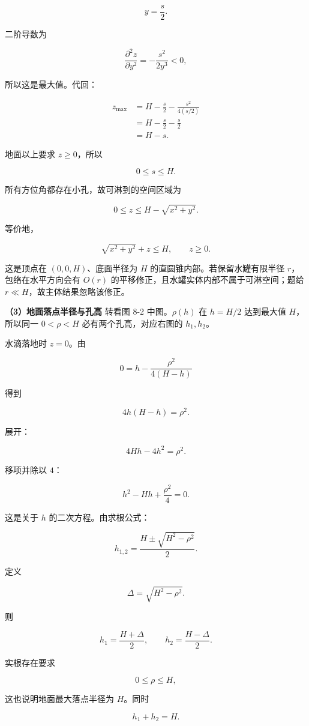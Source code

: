 \documentclass[12pt,a4paper,UTF8]{ctexart}
\begin{document}
\[y=\frac s2.\]

二阶导数为

\[\frac{\partial^2z}{\partial y^2}
=-\frac{s^2}{2y^3}<0,\]

所以这是最大值。代回：

\[\begin{aligned}
z_{\max}
&=H-\frac s2-\frac{s^2}{4(s/2)}\\
&=H-\frac s2-\frac s2\\
&=H-s.
\end{aligned}\]

地面以上要求 \(z\geq0\)，所以

\[0\leq s\leq H.\]

所有方位角都存在小孔，故可淋到的空间区域为

\[\boxed{
0\leq z\leq H-\sqrt{x^2+y^2}
}.\]

等价地，

\[\boxed{
\sqrt{x^2+y^2}+z\leq H,\qquad z\geq0
}.\]

这是顶点在 \((0,0,H)\)、底面半径为 \(H\)
的直圆锥内部。若保留水罐有限半径 \(r\)，包络在水平方向会有 \(O(r)\)
的平移修正，且水罐实体内部不属于可淋空间；题给
\(r\ll H\)，故主体结果忽略该修正。

\textbf{（3）地面落点半径与孔高} 转看图 8-2 中图。\(\rho(h)\) 在
\(h=H/2\) 达到最大值 \(H\)，所以同一 \(0<\rho<H\)
必有两个孔高，对应右图的 \(h_1,h_2\)。

水滴落地时 \(z=0\)。由

\[0=h-\frac{\rho^2}{4(H-h)}\]

得到

\[4h(H-h)=\rho^2.\]

展开：

\[4Hh-4h^2=\rho^2.\]

移项并除以 \(4\)：

\[h^2-Hh+\frac{\rho^2}{4}=0.\]

这是关于 \(h\) 的二次方程。由求根公式：

\[h_{1,2}
=\frac{H\pm\sqrt{H^2-\rho^2}}{2}.\]

定义

\[\Delta=\sqrt{H^2-\rho^2}.\]

则

\[h_1=\frac{H+\Delta}{2},\qquad
h_2=\frac{H-\Delta}{2}.\]

实根存在要求

\[0\leq\rho\leq H,\]

这也说明地面最大落点半径为 \(H\)。同时

\[h_1+h_2=H.\]
\end{document}
